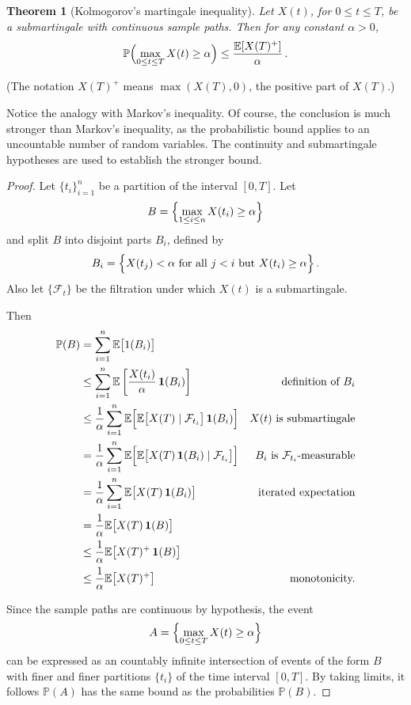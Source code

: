 \documentclass[12pt]{article}
\newtheorem*{thm*}{Theorem}
\newcommand{\sF}{\mathcal{F}}
\newcommand{\PP}{\mathbb{P}}
\newcommand{\E}{\mathbb{E}}
\newcommand{\indc}{\mathbf{1}}
\begin{document}
\begin{thm*}[Kolmogorov's martingale inequality]
Let $X(t)$, for $0 \leq t \leq T$, be a submartingale
with continuous sample paths.
Then for any constant $\alpha > 0$,
\[
\PP \Bigl( \max_{0 \leq t \leq T} X(t) \geq \alpha \Bigr)
\leq \frac{\E[ X(T)^+ ]}{\alpha}\,.
\]
\end{thm*}
(The notation $X(T)^+$ means $\max(X(T),0)$, the positive part of $X(T)$.)

Notice the analogy with Markov's inequality.
Of course, the conclusion is much stronger than Markov's inequality,
as the probabilistic bound applies to an uncountable number
of random variables.  The continuity and submartingale hypotheses
are used to establish the stronger bound.

\begin{proof}
Let $\{ t_i \}_{i=1}^n$ be a partition of the interval $[0,T]$.
Let 
\[
B = \Bigl\{ \max_{1 \leq i \leq n} X(t_i) \geq \alpha \Bigr\}
\]
and split $B$ into disjoint parts $B_i$,
defined by
\[
B_i = \Bigl\{ X(t_j) < \alpha \text{ for all } j < i
                              \text{ but } X(t_i) \geq \alpha \Bigr\}\,.
\]
Also let $\{ \sF_t \}$ be the filtration under which $X(t)$ 
is a submartingale.

Then
\begin{align*}
\PP(B) 
 &=
   \sum_{i=1}^n \E\bigl[1(B_i)\bigr] \\
 &\leq 
  \sum_{i=1}^n \E \left[ \frac{X(t_i)}{\alpha} \, \indc(B_i) \right] 
  & \text{definition of $B_i$} \\
 &\leq 
  \frac{1}{\alpha} \sum_{i=1}^n 
    \E\Bigl[ \E \bigl[X(T) \mid \sF_{t_i} \bigr] \, \indc(B_i) \Bigr] 
  & \text{$X(t)$ is submartingale} \\
 &=
  \frac{1}{\alpha} \sum_{i=1}^n
    \E\Bigl[ \E\bigl[X(T) \, \indc(B_i) \mid \sF_{t_i} \bigr] \Bigr] 
  & \text{$B_i$ is $\sF_{t_i}$-measurable} \\
 &=
  \frac{1}{\alpha} \sum_{i=1}^n
    \E\bigl[ X(T) \, \indc(B_i) \bigr] 
  & \text{iterated expectation} \\
 &=
  \frac{1}{\alpha} \E\bigl[ X(T) \, \indc(B) \bigr] \\
 &\leq
  \frac{1}{\alpha} \E\bigl[ X(T)^+ \, \indc(B) \bigr] \\
 &\leq
  \frac{1}{\alpha} \E\bigl[ X(T)^+ \bigr] &
  \text{monotonicity.} 
\end{align*}

Since the sample paths are continuous by hypothesis,
the event 
\[
A = \Bigl\{ \max_{0 \leq t \leq T} X(t) \geq \alpha \Bigr\}
\]
can be expressed as an countably infinite intersection
of events of the form $B$ with finer and finer partitions $\{ t_i \}$
of the time interval $[0,T]$.
By taking limits, it follows
$\PP(A)$
has the same bound as the probabilities $\PP(B)$.
\end{proof}
\end{document}

